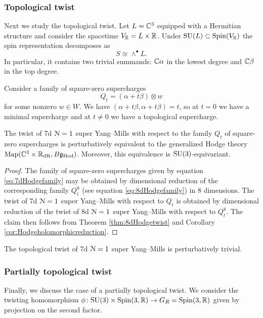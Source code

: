 \documentclass[10pt, oneside]{article}
\newcommand{\Hod}{\mathrm{Hod}}
\begin{document}
\subsubsection{Topological twist}

Next we study the topological twist. Let $L=\mathbb C^3$ equipped with a Hermitian structure and consider the spacetime $V_\mathbb R=L\times \mathbb R$. Under $\mathrm{SU}(L)\subset \mathrm{Spin}(V_\mathbb R)$ the spin representation decomposes as
\[S\cong \wedge^\bullet L.\]
In particular, it contains two trivial summands: $\mathbb C\alpha$ in the lowest degree and $\mathbb C\beta$ in the top degree.

Consider a family of square-zero supercharges
\begin{equation}
Q_t = (\alpha + t\beta)\otimes w
\label{eq:7dHodgefamily}
\end{equation}
for some nonzero $w\in W$. We have $(\alpha + t\beta, \alpha + t\beta)=t$, so at $t=0$ we have a minimal supercharge and at $t\neq 0$ we have a topological supercharge.

\begin{thm}
The twist of 7d $\mathcal N=1$ super Yang--Mills with respect to the family $Q_t$ of square-zero supercharges is perturbatively equivalent to the generalized Hodge theory $\map(\CC^3\times \RR_{\mr{dR}}, B\fg_{\Hod})$. Moreover, this equivalence is $\mathrm{SU}(3)$-equivariant.
\end{thm}
\begin{proof}
The family of square-zero supercharges given by equation \eqref{eq:7dHodgefamily} may be obtained by dimensional reduction of the corresponding family $Q_t^8$ (see equation \eqref{eq:8dHodgefamily}) in 8 dimensions. The twist of 7d $\mathcal N=1$ super Yang--Mills with respect to $Q_t$ is obtained by dimensional reduction of the twist of 8d $\mathcal N=1$ super Yang--Mills with respect to $Q_t^8$. The claim then follows from Theorem \ref{thm:8dHodgetwist} and Corollary \ref{cor:Hodgeholomorphicreduction}.
\end{proof}

\begin{cor}
The topological twist of 7d $\mathcal N=1$ super Yang--Mills is perturbatively trivial.
\end{cor}

\subsubsection{Partially topological twist}

Finally, we discuss the case of a partially topological twist. We consider the twisting homomorphism $\phi\colon \mathrm{SU}(3)\times \mathrm{Spin}(3, \mathbb R)\rightarrow G_R=\mathrm{Spin}(3, \mathbb R)$ given by projection on the second factor.
\end{document}
